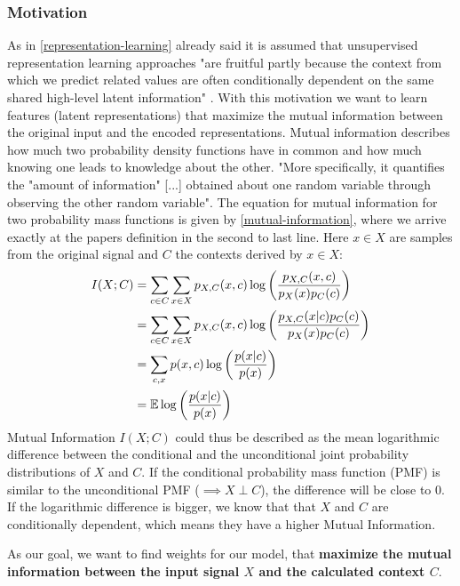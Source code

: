 \subsubsection{Motivation} \label{sec:motivation}
As in \autoref{representation-learning} already said it is assumed that unsupervised representation learning approaches "are fruitful partly because the context from which we predict related values are often conditionally dependent on the same shared high-level latent information" \autocite{DBLP:journals/corr/abs-1807-03748}. With this motivation we want to learn features (latent representations) that maximize the mutual information between the original input and the encoded representations. Mutual information describes how much two probability density functions have in common and how much knowing one leads to knowledge about the other. "More specifically, it quantifies the "amount of information" [...] obtained about one random variable through observing the other random variable". \autocite{MutualinformationWikipedia-2021-03-25}
The equation for mutual information for two probability mass functions is given by \autoref{mutual-information}, where we arrive exactly at the papers definition in the second to last line. Here $x \in X$ are samples from the original signal and $C$ the contexts derived by $x\in X$:
\begin{equation}
	\label{mutual-information}
	\begin{aligned}
		I(X;C)&=\sum_{c\in C}\sum_{x\in X}p_{X,C}(x,c)\log\left(\frac{p_{X,C}(x,c)}{p_X(x)p_C(c)}\right)\\
		&=\sum_{c\in C}\sum_{x\in X}p_{X,C}(x,c)\log\left(\frac{p_{X,C}(x|c)p_C(c)}{p_X(x)p_C(c)}\right)\\
		&=\sum_{c, x}p(x,c)\log\left(\frac{p(x|c)}{p(x)}\right)\\
		&=\operatorname{\mathbb{E}}\log\left(\frac{p(x|c)}{p(x)}\right)
	\end{aligned}
\end{equation}
Mutual Information $I(X; C)$ could thus be described as the mean logarithmic difference between the conditional and the unconditional joint probability distributions of $X$ and $C$. If the conditional probability mass function (PMF) is similar to the unconditional PMF ($\implies X \perp C$), the difference will be close to 0. If the logarithmic difference is bigger, we know that that $X$ and $C$ are conditionally dependent, which means they have a higher Mutual Information.

As our goal, we want to find weights for our model, that \textbf{maximize the mutual information between the input signal $X$ and the calculated context $C$}.

